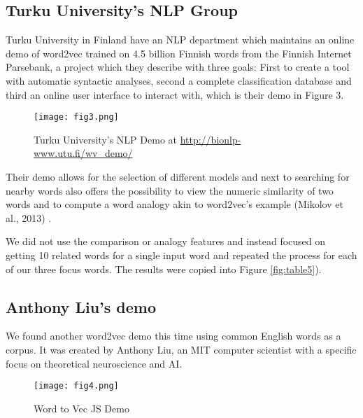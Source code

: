 \documentclass[12pt, usenames, dvipsnames]{report}
\begin{document}
\begin{flushleft}
\subsection{Turku University’s NLP Group}

Turku University in Finland have an NLP department which maintains an online demo of word2vec trained on 4.5 billion Finnish words from the Finnish Internet Parsebank, a project which they describe with three goals:
First to create a tool with automatic syntactic analyses, second a complete classification database and third an online user interface to interact with, which is their demo in Figure 3.

\vspace*{1.2em}
\begin{figure}[!htbp]
  \hspace*{-3.666em}
  \texttt{[image: fig3.png]}
  \caption{Turku University’s NLP Demo at \url{http://bionlp-www.utu.fi/wv_demo/}}
  \label{fig:figure3}
\end{figure}
\vspace*{1.2em}

Their demo allows for the selection of different models and next to searching
for nearby words also offers the possibility to view the numeric similarity of two words and to compute a word analogy akin to word2vec's example  (Mikolov et al., 2013) \cite{mikolov2013}.

We did not use the comparison or analogy features and instead focused on getting 10 related words for a single input word and repeated the process for each of our three focus words.
The results were copied into Figure \ref{fig:table5}).

\subsection{Anthony Liu’s demo}

We found another word2vec demo this time using common English words as a corpus.
It was created by Anthony Liu, an MIT computer scientist with a specific focus on theoretical neuroscience and AI.

\vspace*{1.2em}
\begin{figure}[!htbp]
  \hspace*{-3.666em}
  \texttt{[image: fig4.png]}
  \caption{Word to Vec JS Demo}
  \label{fig:figure4}
\end{figure}
\vspace*{1.2em}


\end{flushleft}
\end{document}
